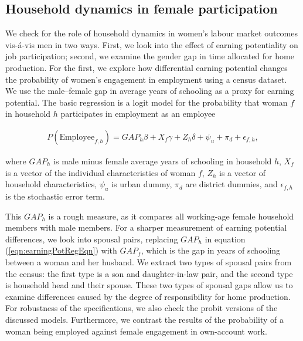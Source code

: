 \subsection{Household dynamics in female participation}

We check for the role of household dynamics in women’s labour market outcomes vis-\'{a}-vis men in two ways. First, we look into the effect of earning potentiality on job participation; second, we examine the gender gap in time allocated for home production. For the first, we explore how differential earning potential changes the probability of women’s engagement in employment using a census dataset. We use the male–female gap in average years of schooling as a proxy for earning potential. The basic regression is a logit model for the probability that woman $f$ in household $h$ participates in employment as an employee 
\begin{linenomath*}\begin{align}
	P(\text{Employee}_{f, h}) = GAP_{h}\beta+ X_{f}\gamma+ Z_{h}\delta+ \psi_{u} + \pi_{d} + \epsilon_{f,h}, \label{eqn:earningPotRegEqn}
	\end{align}\end{linenomath*} 
where $GAP_{h}$ is male minus female average years of schooling in household $h$, $X_{f}$ is a vector of the individual characteristics of woman $f$, $Z_{h}$ is a vector of household characteristics, $\psi_{u}$ is urban dummy, $\pi_{d}$ are district dummies, and $\epsilon_{f,h}$ is the stochastic error term.\par

This $GAP_{h}$ is a rough measure, as it compares all working-age female household members with male members. For a sharper measurement of earning potential differences, we look into spousal pairs, replacing $GAP_{h}$ in equation (\ref{eqn:earningPotRegEqn}) with $GAP_{f}$, which is the gap in years of schooling between a woman and her husband. We extract two types of spousal pairs from the census: the first type is a son and daughter-in-law pair, and the second type is household head and their spouse. These two types of spousal gaps allow us to examine differences caused by the degree of responsibility for home production. For robustness of the specifications, we also check the probit versions of the discussed models. Furthermore, we contrast the results of the probability of a woman being employed against female engagement in own-account work.\par 


